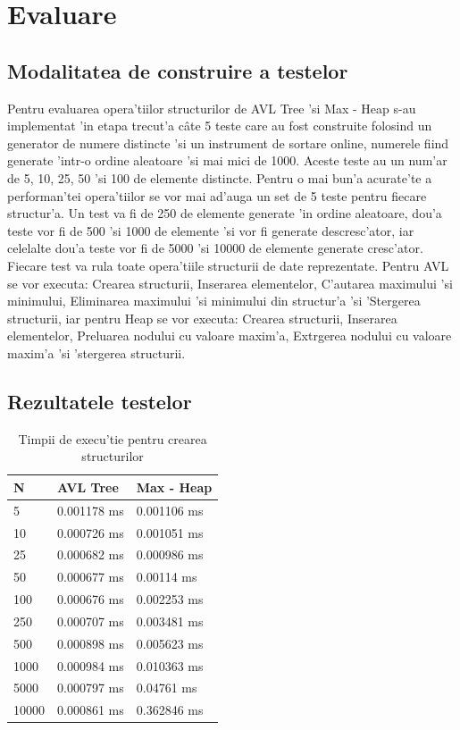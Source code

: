 \chapter{Evaluare}
\section{Modalitatea de construire a testelor}
Pentru evaluarea opera'tiilor structurilor de AVL Tree 'si Max - Heap s-au implementat 'in etapa trecut'a c\^ate 5 teste care au fost construite folosind un generator de numere distincte\cite{Random} 'si un instrument de sortare online\cite{Endmemo}, numerele fiind generate 'intr-o ordine aleatoare 'si mai mici de 1000. Aceste teste au un num'ar de 5, 10, 25, 50 'si 100 de elemente distincte. Pentru o mai bun'a acurate'te a performan'tei opera'tiilor se vor mai ad'auga un set de 5 teste pentru fiecare structur'a. Un test va fi de 250 de elemente generate 'in ordine aleatoare, dou'a teste vor fi de 500 'si 1000 de elemente 'si vor fi generate descresc'ator, iar celelalte dou'a teste vor fi de 5000 'si 10000 de elemente generate cresc'ator.
\myindent Fiecare test va rula toate opera'tiile structurii de date reprezentate. Pentru AVL se vor executa: Crearea structurii, Inserarea elementelor, C'autarea maximului 'si minimului, Eliminarea maximului 'si minimului din structur'a 'si 'Stergerea structurii, iar pentru Heap se vor executa: Crearea structurii, Inserarea elementelor, Preluarea nodului cu valoare maxim'a, Extrgerea nodului cu valoare maxim'a 'si 'stergerea structurii.
\vspace{5 mm}
\section{Rezultatele testelor}
\begin{table}[ht]
\centering
\caption{Timpii de execu'tie pentru crearea structurilor}
\begin{tabular}{| p{5cm} | p{5cm} | p{5cm} |}
\hline
N & AVL Tree & Max - Heap \\
\hline\hline
5 & 0.001178 ms & 0.001106 ms \\
\hline
10 & 0.000726 ms & 0.001051 ms \\
\hline
25 & 0.000682 ms & 0.000986 ms \\
\hline
50 & 0.000677 ms & 0.00114 ms \\
\hline
100 & 0.000676 ms & 0.002253 ms \\
\hline
250 & 0.000707 ms & 0.003481 ms \\
\hline
500 & 0.000898 ms & 0.005623 ms \\
\hline
1000 & 0.000984 ms & 0.010363 ms \\
\hline
5000 & 0.000797 ms & 0.04761 ms \\
\hline
10000 & 0.000861 ms & 0.362846 ms \\
\hline
\end{tabular}
\end{table}
\FloatBarrier

